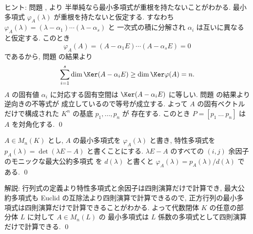 \documentclass[12pt,twoside]{jarticle}
\begin{document}
\noindent
ヒント: 問題 ,  より
半単純なら最小多項式が重根を持たないことがわかる.
最小多項式 $\varphi_A(\lambda)$ が重根を持たないと仮定する. 
すなわち $\varphi_A(\lambda)=(\lambda-\alpha_1)\cdots(\lambda-\alpha_s)$ と
一次式の積に分解され $\alpha_i$ は互いに異なると仮定する. このとき
\begin{equation*}
  \varphi_A(A)=(A-\alpha_1E)\cdots(A-\alpha_sE)=0
\end{equation*}
であるから, 問題  の結果より
\begin{equation*}
  \sum_{i=1}^s \dim\Ker(A - \alpha_iE) \ge \dim\Ker\varphi(A) = n.
\end{equation*}
$A$ の固有値 $\alpha_i$ に対応する固有空間は $\Ker(A - \alpha_iE)$ 
に等しい.  問題  の結果より逆向きの不等式が
成立しているので等号が成立する. 
よって $A$ の固有ベクトルだけで構成された $K^n$ の基底 $p_1,\dots,p_n$ が
存在する.  このとき $P=[p_1\ \dots\ p_n]$ は $A$ を対角化する. 
\qed


\begin{question}[最小多項式の有理的計算法]
  $A\in M_n(K)$ とし, $A$ の最小多項式を $\varphi_A(\lambda)$ と書き,
  特性多項式を $p_A(\lambda)=\det(\lambda E - A)$ と書くことにする.
  $\lambda E - A$ のすべての $(i,j)$ 余因子のモニックな最大公約多項式
  を $d(\lambda)$ と書くと $\varphi_A(\lambda)=p_A(\lambda)/d(\lambda)$ である.
  \qed
\end{question}

\noindent
解説: 行列式の定義より特性多項式と余因子は四則演算だけで計算でき, 
最大公約多項式も Euclid の互除法より四則演算で計算できるので,
正方行列の最小多項式は四則演算だけで計算できることがわかる.
よって代数閉体 $K$ の任意の部分体 $L$ に対して $A\in M_n(L)$ の
最小多項式は $L$ 係数の多項式として四則演算だけで計算できる.
\qed
\end{document}
